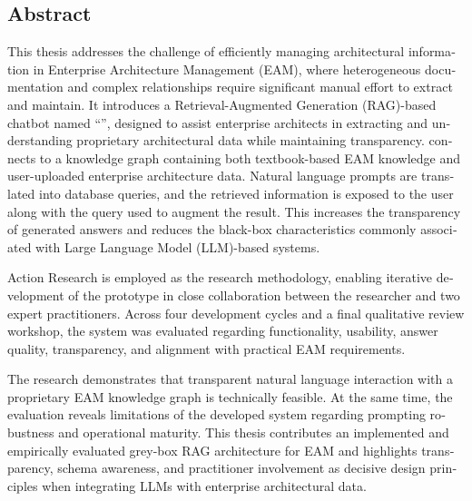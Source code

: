 

\begin{otherlanguage}{american}
	\chapter*{Abstract}
	This thesis addresses the challenge of efficiently managing architectural information in Enterprise Architecture Management (EAM), where heterogeneous documentation and complex relationships require significant manual effort to extract and maintain. It introduces a Retrieval-Augmented Generation (RAG)-based chatbot named “\prototype{}”, designed to assist enterprise architects in extracting and understanding proprietary architectural data while maintaining transparency. \prototype{} connects to a knowledge graph containing both textbook-based EAM knowledge and user-uploaded enterprise architecture data. Natural language prompts are translated into database queries, and the retrieved information is exposed to the user along with the query used to augment the result. This increases the transparency of generated answers and reduces the black-box characteristics commonly associated with Large Language Model (LLM)-based systems.

Action Research is employed as the research methodology, enabling iterative development of the prototype in close collaboration between the researcher and two expert practitioners. Across four development cycles and a final qualitative review workshop, the system was evaluated regarding functionality, usability, answer quality, transparency, and alignment with practical EAM requirements.

The research demonstrates that transparent natural language interaction with a proprietary EAM knowledge graph is technically feasible. At the same time, the evaluation reveals limitations of the developed system regarding prompting robustness and operational maturity. This thesis contributes an implemented and empirically evaluated grey-box RAG architecture for EAM and highlights transparency, schema awareness, and practitioner involvement as decisive design principles when integrating LLMs with enterprise architectural data.
	
	\end{otherlanguage}
